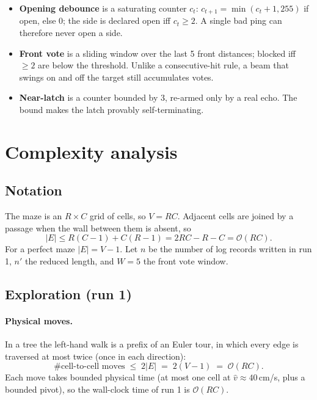 \documentclass[11pt,a4paper]{article}
\newcommand{\bigO}[1]{\mathcal{O}\!\left(#1\right)}
\theoremstyle{plain}
\theoremstyle{definition}
\begin{document}
\begin{itemize}
  \item \textbf{Opening debounce} is a saturating counter $c_t$:
        $c_{t+1} = \min(c_t+1, 255)$ if open, else 0; the side is declared
        open iff $c_t \ge 2$. A single bad ping can therefore never open a
        side.
  \item \textbf{Front vote} is a sliding window over the last 5 front
        distances; blocked iff $\ge 2$ are below the threshold. Unlike a
        consecutive-hit rule, a beam that swings on and off the target
        still accumulates votes.
  \item \textbf{Near-latch} is a counter bounded by 3, re-armed only by a
        real echo. The bound makes the latch provably self-terminating.
\end{itemize}

\section{Complexity analysis}\label{sec:complexity}

\subsection{Notation}

The maze is an $R\times C$ grid of cells, so $V = RC$. Adjacent cells are
joined by a passage when the wall between them is absent, so
\[
  |E| \le R(C-1) + C(R-1) = 2RC - R - C = \bigO{RC}.
\]
For a perfect maze $|E| = V-1$. Let $n$ be the number of log records
written in run 1, $n'$ the reduced length, and $W = 5$ the front vote
window.

\subsection{Exploration (run 1)}

\paragraph{Physical moves.} In a tree the left-hand walk is a prefix of an
Euler tour, in which every edge is traversed at most twice (once in each
direction):
\[
  \#\text{cell-to-cell moves} \;\le\; 2|E| \;=\; 2(V-1) \;=\; \bigO{RC}.
\]
Each move takes bounded physical time (at most one cell at
$\hat v \approx 40$\,cm/s, plus a bounded pivot), so the wall-clock time of
run 1 is $\bigO{RC}$.
\end{document}
